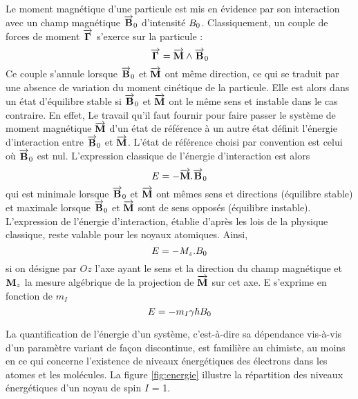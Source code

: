Le moment magnétique d'une particule est mis en évidence par
son interaction avec un champ magnétique $\overrightarrow{\mathbf{B}}_0$
d'intensité $B_0$.
Classiquement, un couple de forces de moment
$\overrightarrow{\mathbf{\Gamma}}$ s'exerce sur la particule :
\begin{equation}
\overrightarrow{\mathbf{\Gamma}} = \overrightarrow{\mathbf{M}} \wedge \overrightarrow{\mathbf{B}}_0
\end{equation}
Ce couple s'annule lorsque $\overrightarrow{\mathbf{B}}_0$ et $\overrightarrow{\mathbf{M}}$
ont même direction, ce qui se traduit par une absence
de variation du moment cinétique de la particule.
Elle est alors dans un état d'équilibre stable si
$\overrightarrow{\mathbf{B}}_0$ et $\overrightarrow{\mathbf{M}}$ ont le même sens et
instable dans le cas contraire.
En effet, Le travail qu'il faut fournir pour faire passer le système
de moment magnétique $\overrightarrow{\mathbf{M}}$ d'un état de référence à un autre état définit l'énergie
d'interaction entre $\overrightarrow{\mathbf{B}}_0$ et $\overrightarrow{\mathbf{M}}$.
L'état de référence choisi par convention est celui où $\overrightarrow{\mathbf{B}}_0$ est nul.
L'expression classique de l'énergie d'interaction est alors
\begin{equation}
E = - \overrightarrow{\mathbf{M}} . \overrightarrow{\mathbf{B}}_0
\end{equation}
qui est minimale lorsque $\overrightarrow{\mathbf{B}}_0$ et $\overrightarrow{\mathbf{M}}$
ont mêmes sens et directions (équilibre stable) et maximale
lorsque $\overrightarrow{\mathbf{B}}_0$ et $\overrightarrow{\mathbf{M}}$ sont de sens opposés
(équilibre instable).
L'expression de l'énergie d'interaction, établie d'après les lois de la physique
classique, reste valable pour les noyaux atomiques.
Ainsi,
\begin{equation}
E = - M_z.B_0
\end{equation}
si on désigne par $Oz$ l'axe ayant le sens et la
direction du champ magnétique et $\mathbf{M}_z$ la mesure algébrique
de la projection de $\overrightarrow{\mathbf{M}}$ sur cet axe.
E s'exprime en fonction de $m_I$
\begin{equation}
E = - m_I \gamma \hbar B_0
\end{equation}

La quantification de l'énergie d'un système, c'est-à-dire sa dépendance vis-à-vis d'un
paramètre variant de façon discontinue, est familière au chimiste, au moins en ce qui
concerne l'existence de niveaux énergétiques des électrons dans les atomes et les
molécules.
La figure \ref{fig:energie} illustre la répartition des niveaux énergétiques d'un
noyau de spin $I$ = 1.


